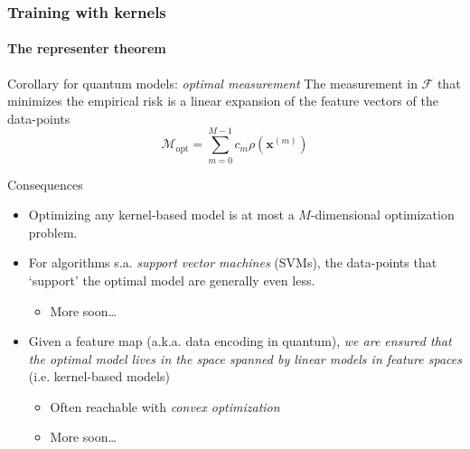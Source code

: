 \documentclass[aspectratio=43]{beamer}
\begin{document}
\begin{frame}
  \frametitle{Training with kernels}
  \framesubtitle{The representer theorem}
  
  \footnotesize
  \begin{block}{Corollary for quantum models: \emph{optimal measurement}}
    The measurement in $\mathcal{F}$ that minimizes the empirical risk is a linear expansion of the feature vectors of the data-points
    \[\mathcal{M}_{\mathrm{opt}} = \sum_{m=0}^{M-1} c_m \rho\left( \mathbf{x}^{(m)} \right)\]
  \end{block}

  Consequences
  \begin{itemize}
    \item Optimizing any kernel-based model is at most a $M$-dimensional optimization problem.
    \item For algorithms s.a. \emph{support vector machines} (SVMs), the data-points that `support' the optimal model are generally even less.
    \begin{itemize}
      \item More soon\dots
    \end{itemize}
    \item Given a feature map (a.k.a. data encoding in quantum), \emph{we are ensured that the optimal model lives in the space spanned by linear models in feature spaces} (i.e. kernel-based models)
    \begin{itemize}
      \item Often reachable with \emph{convex optimization}
      \item More soon\dots
    \end{itemize}
  \end{itemize}

\end{frame}
\end{document}

